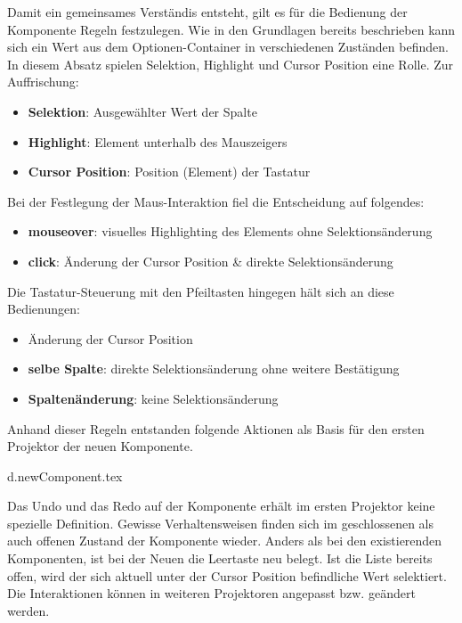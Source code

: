 Damit ein gemeinsames Verständis entsteht, gilt es für die Bedienung der Komponente Regeln festzulegen.
Wie in den Grundlagen bereits beschrieben kann sich ein Wert aus dem Optionen-Container in verschiedenen Zuständen befinden.
In diesem Absatz spielen Selektion, Highlight und Cursor Position eine Rolle.
Zur Auffrischung: 

\begin{itemize}
    \item \textbf{Selektion}: Ausgewählter Wert der Spalte
    \item \textbf{Highlight}: Element unterhalb des Mauszeigers
    \item \textbf{Cursor Position}: Position (Element) der Tastatur
\end{itemize}

\noindent
Bei der Festlegung der Maus-Interaktion fiel die Entscheidung auf folgendes:

\begin{itemize}
    \item \textbf{mouseover}: visuelles Highlighting des Elements ohne Selektionsänderung
    \item \textbf{click}: Änderung der Cursor Position \& direkte Selektionsänderung
\end{itemize}

\noindent
Die Tastatur-Steuerung mit den Pfeiltasten hingegen hält sich an diese Bedienungen:

\begin{itemize}
    \item Änderung der Cursor Position
    \item \textbf{selbe Spalte}: direkte Selektionsänderung ohne weitere Bestätigung
    \item \textbf{Spaltenänderung}: keine Selektionsänderung
\end{itemize}

\noindent
Anhand dieser Regeln entstanden folgende Aktionen als Basis für den ersten Projektor der neuen Komponente. 


\clearpage
{d.newComponent.tex}

Das Undo und das Redo auf der Komponente erhält im ersten Projektor keine spezielle Definition.
Gewisse Verhaltensweisen finden sich im geschlossenen als auch offenen Zustand der Komponente wieder.
Anders als bei den existierenden Komponenten, ist bei der Neuen die Leertaste neu belegt. 
Ist die Liste bereits offen, wird der sich aktuell unter der Cursor Position befindliche Wert selektiert.
Die Interaktionen können in weiteren Projektoren angepasst bzw. geändert werden.


